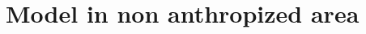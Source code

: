 \documentclass{article}
\begin{document}
\section{Model in non anthropized area}
%
%
\end{document}
